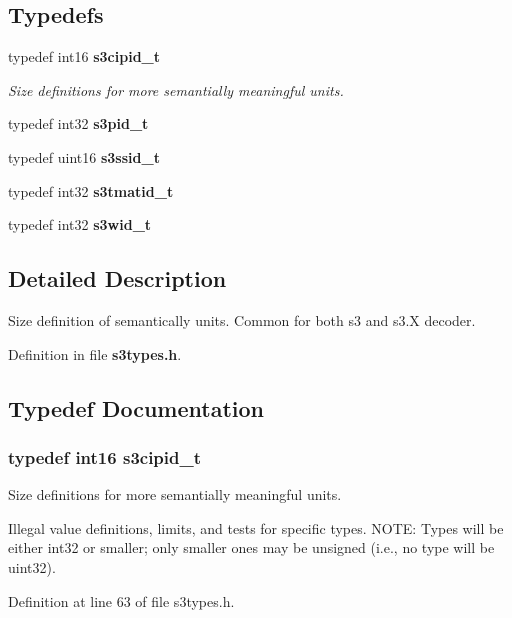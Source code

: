 \subsection*{Typedefs}
\begin{DoxyCompactItemize}
\item 
typedef int16 {\bf s3cipid\-\_\-t}
\begin{DoxyCompactList}\small\item\em Size definitions for more semantially meaningful units. \end{DoxyCompactList}\item 
typedef int32 {\bfseries s3pid\-\_\-t}\label{s3types_8h_ace0794ef7ba6d215e2688832216771b8}

\item 
typedef uint16 {\bfseries s3ssid\-\_\-t}\label{s3types_8h_afa911acbebf09269bbc7b6821aee9c1d}

\item 
typedef int32 {\bfseries s3tmatid\-\_\-t}\label{s3types_8h_a6a7df1b2c1909fbe51979dac693549c0}

\item 
typedef int32 {\bfseries s3wid\-\_\-t}\label{s3types_8h_a1d7fc272539abdf946c1074f9ec9a71c}

\end{DoxyCompactItemize}


\subsection{Detailed Description}
Size definition of semantically units. Common for both s3 and s3.\-X decoder. 

Definition in file {\bf s3types.\-h}.



\subsection{Typedef Documentation}
\subsubsection[{s3cipid\-\_\-t}]{\setlength{\rightskip}{0pt plus 5cm}typedef int16 {\bf s3cipid\-\_\-t}}\label{s3types_8h_ae5f70241ce62a79747f0611029a6409d}


Size definitions for more semantially meaningful units. 

Illegal value definitions, limits, and tests for specific types. N\-O\-T\-E\-: Types will be either int32 or smaller; only smaller ones may be unsigned (i.\-e., no type will be uint32). 

Definition at line 63 of file s3types.\-h.

